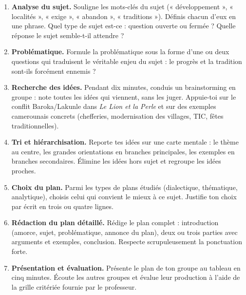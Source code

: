 \documentclass[11pt]{article}
\newcounter{popsec}
\newcounter{popsub}
\newcommand{\courssub}[1]{%
  \stepcounter{popsub}%
  \par\vspace{9pt}\noindent{\popxbold\fontsize{11.5}{13}\selectfont\color{popink}{\color{poporange}\thepopsec.\thepopsub}\hspace{6pt}#1}\par\nopagebreak\vspace{4pt}
}
\begin{document}
\begin{enumerate}
\item \textbf{Analyse du sujet.} Souligne les mots-clés du sujet (« développement », « localités », « exige », « abandon », « traditions »). Définis chacun d'eux en une phrase. Quel type de sujet est-ce : question ouverte ou fermée ? Quelle réponse le sujet semble-t-il attendre ?
\item \textbf{Problématique.} Formule la problématique sous la forme d'une ou deux questions qui traduisent le véritable enjeu du sujet : le progrès et la tradition sont-ils forcément ennemis ?
\item \textbf{Recherche des idées.} Pendant dix minutes, conduis un brainstorming en groupe : note toutes les idées qui viennent, sans les juger. Appuie-toi sur le conflit Baroka/Lakunle dans \emph{Le Lion et la Perle} et sur des exemples camerounais concrets (chefferies, modernisation des villages, TIC, fêtes traditionnelles).
\item \textbf{Tri et hiérarchisation.} Reporte tes idées sur une carte mentale : le thème au centre, les grandes orientations en branches principales, les exemples en branches secondaires. Élimine les idées hors sujet et regroupe les idées proches.
\item \textbf{Choix du plan.} Parmi les types de plans étudiés (dialectique, thématique, analytique), choisis celui qui convient le mieux à ce sujet. Justifie ton choix par écrit en trois ou quatre lignes.
\item \textbf{Rédaction du plan détaillé.} Rédige le plan complet : introduction (amorce, sujet, problématique, annonce du plan), deux ou trois parties avec arguments et exemples, conclusion. Respecte scrupuleusement la ponctuation forte.
\item \textbf{Présentation et évaluation.} Présente le plan de ton groupe au tableau en cinq minutes. Écoute les autres groupes et évalue leur production à l'aide de la grille critériée fournie par le professeur.
\end{enumerate}

\courssub{Ressources à mobiliser}
\end{document}
